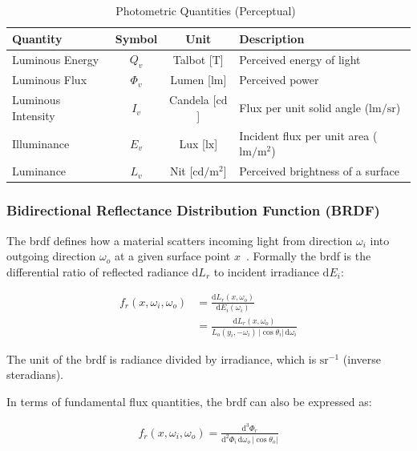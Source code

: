 \begin{table}
    \centering
    \caption{Photometric Quantities (Perceptual)~\cite{tuwien_rendering_2020}}
    \label{tab:photometric-quantities}
    \begin{tabular}{lccl}
        \toprule
        \textbf{Quantity} & \textbf{Symbol} & \textbf{Unit} & \textbf{Description} \\
        \midrule
        Luminous Energy & $Q_v$ & Talbot [$\mathrm{T}$] & Perceived energy of light \\
        Luminous Flux & $\Phi_v$ & Lumen [$\mathrm{lm}$] & Perceived power \\
        Luminous Intensity & $I_v$ & Candela [$\mathrm{cd}$] & Flux per unit solid angle ($\mathrm{lm/sr}$) \\
        Illuminance & $E_v$ & Lux [$\mathrm{lx}$] & Incident flux per unit area ($\mathrm{lm/m^2}$) \\
        Luminance & $L_v$ & Nit [$\mathrm{cd/m^2}$] & Perceived brightness of a surface \\
        \bottomrule
    \end{tabular}
\end{table}

\subsubsection{Bidirectional Reflectance Distribution Function (BRDF)}\label{subsubsec:brdf}

The \gls{brdf} defines how a material scatters incoming light from direction $\omega_i$ 
into outgoing direction $\omega_o$ at a given surface point $x$~\cite{136913.136929}.
Formally the \gls{brdf} is the differential ratio of reflected radiance $\mathrm{d}L_r$ 
to incident irradiance $\mathrm{d}E_i$:

\begin{align}
    f_r(x, \omega_i, \omega_o) &= \frac{\mathrm{d} L_r(x, \omega_o)}{\mathrm{d} E_i(\omega_i)} \\
    &= \frac{\mathrm{d} L_r(x, \omega_o)}{L_o(y_i, -\omega_i) \, |\cos\theta_i| \, \mathrm{d}\omega_i}
\end{align}

The unit of the \gls{brdf} is radiance divided by irradiance, which is $\mathrm{sr^{-1}}$ (inverse steradians).

In terms of fundamental flux quantities, the \gls{brdf} can also be expressed as:

\begin{align}
    f_r(x, \omega_i, \omega_o) = \frac{\mathrm{d}^3 \Phi_r}{\mathrm{d}^2 \Phi_i \, \mathrm{d}\omega_o \, |\cos\theta_o|}
\end{align}

